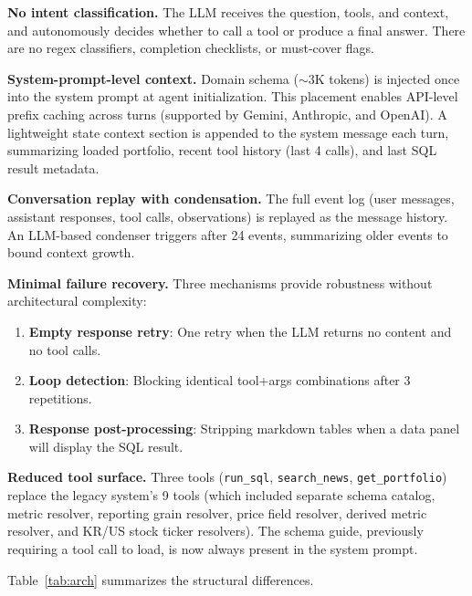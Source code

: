 \documentclass{article}
\begin{document}
\textbf{No intent classification.}
The LLM receives the question, tools, and context, and autonomously decides whether to call a tool or produce a final answer. There are no regex classifiers, completion checklists, or must-cover flags.

\textbf{System-prompt-level context.}
Domain schema (${\sim}$3K tokens) is injected once into the system prompt at agent initialization. This placement enables API-level prefix caching across turns (supported by Gemini, Anthropic, and OpenAI). A lightweight state context section is appended to the system message each turn, summarizing loaded portfolio, recent tool history (last 4 calls), and last SQL result metadata.

\textbf{Conversation replay with condensation.}
The full event log (user messages, assistant responses, tool calls, observations) is replayed as the message history. An LLM-based condenser triggers after 24 events, summarizing older events to bound context growth.

\textbf{Minimal failure recovery.}
Three mechanisms provide robustness without architectural complexity:
\begin{enumerate}[nosep,leftmargin=*]
  \item \textbf{Empty response retry}: One retry when the LLM returns no content and no tool calls.
  \item \textbf{Loop detection}: Blocking identical tool+args combinations after 3 repetitions.
  \item \textbf{Response post-processing}: Stripping markdown tables when a data panel will display the SQL result.
\end{enumerate}

\textbf{Reduced tool surface.}
Three tools (\texttt{run\_sql}, \texttt{search\_news}, \texttt{get\_portfolio}) replace the legacy system's 9 tools (which included separate schema catalog, metric resolver, reporting grain resolver, price field resolver, derived metric resolver, and KR/US stock ticker resolvers). The schema guide, previously requiring a tool call to load, is now always present in the system prompt.

Table~\ref{tab:arch} summarizes the structural differences.
\end{document}
